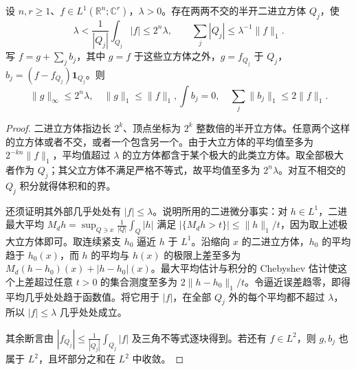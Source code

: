 \begin{lemma}\label{g3:lem:cz-decomposition}
	设 \(n,r\ge1\)、\(f\in L^1(\mathbb R^n;\mathbb C^r)\)，\(\lambda>0\)。存在两两不交的半开二进立方体 \(Q_j\)，使
	\[
		\lambda<\frac1{|Q_j|}\int_{Q_j}|f|\le2^n\lambda,
		\qquad\sum_j|Q_j|\le\lambda^{-1}\|f\|_1.
	\]
	写 \(f=g+\sum_jb_j\)，其中 \(g=f\) 于这些立方体之外，\(g=f_{Q_j}\) 于 \(Q_j\)，\(b_j=(f-f_{Q_j})\mathbf1_{Q_j}\)。则
	\[
		\|g\|_\infty\le2^n\lambda,\quad\|g\|_1\le\|f\|_1,
		\int b_j=0,\quad\sum_j\|b_j\|_1\le2\|f\|_1.
	\]
\end{lemma}
\begin{proof}
	二进立方体指边长 \(2^k\)、顶点坐标为 \(2^k\) 整数倍的半开立方体。任意两个这样的立方体或者不交，或者一个包含另一个。由于大立方体的平均值至多为 \(2^{-kn}\|f\|_1\)，平均值超过 \(\lambda\) 的立方体都含于某个极大的此类立方体。取全部极大者作为 \(Q_j\)；其父立方体不满足严格不等式，故平均值至多为 \(2^n\lambda\)。对互不相交的 \(Q_j\) 积分就得体积和的界。

	还须证明其外部几乎处处有 \(|f|\le\lambda\)。说明所用的二进微分事实：对 \(h\in L^1\)，二进最大平均 \(M_dh=\sup_{Q\ni x}\frac1{|Q|}\int_Q|h|\) 满足
	\(|\{M_dh>t\}|\le\|h\|_1/t\)，因为取上述极大立方体即可。取连续紧支 \(h_0\) 逼近 \(h\) 于 \(L^1\)。沿缩向 \(x\) 的二进立方体，\(h_0\) 的平均趋于 \(h_0(x)\)，而 \(h\) 的平均与 \(h(x)\) 的极限上差至多为 \(M_d(h-h_0)(x)+|h-h_0|(x)\)。最大平均估计与积分的 Chebyshev 估计使这个上差超过任意 \(t>0\) 的集合测度至多为 \(2\|h-h_0\|_1/t\)。令逼近误差趋零，即得平均几乎处处趋于函数值。将它用于 \(|f|\)，在全部 \(Q_j\) 外的每个平均都不超过 \(\lambda\)，所以 \(|f|\le\lambda\) 几乎处处成立。

	其余断言由 \(|f_{Q_j}|\le\frac1{|Q_j|}\int_{Q_j}|f|\) 及三角不等式逐块得到。若还有 \(f\in L^2\)，则 \(g,b_j\) 也属于 \(L^2\)，且坏部分之和在 \(L^2\) 中收敛。
\end{proof}

